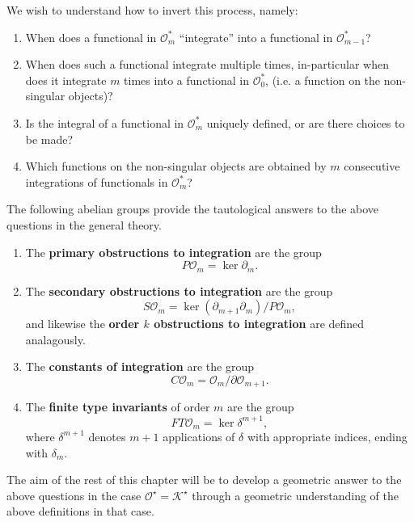 We wish to understand how to invert this process, namely:
\begin{questions}
	\begin{enumerate}
		\item When does a functional in \(\mathcal{O}^{\ast}_{m}\) ``integrate'' into a functional in \(\mathcal{O}^{\ast}_{m - 1}\)?
		\item When does such a functional integrate multiple times, in-particular when does it integrate \(m\) times into a functional in \(\mathcal{O}^{\ast}_{0}\), (i.e. a function on the non-singular objects)?
		\item Is the integral of a functional in \(\mathcal{O}_{m}^{\ast}\) uniquely defined, or are there choices to be made?
		\item Which functions on the non-singular objects are obtained by \(m\) consecutive integrations of functionals in \(\mathcal{O}_{m}^{\ast}\)?
	\end{enumerate}
\end{questions}
The following abelian groups provide the tautological answers to the above questions in the general theory.
\begin{definitions}
	\begin{enumerate}
		\item The \textbf{primary obstructions to integration} are the group
			\[P\mathcal{O}_{m} = \ker{\partial_{m}}.\]
		\item The \textbf{secondary obstructions to integration} are the group
			\[S\mathcal{O}_{m} = \ker{(\partial_{m + 1}\partial_{m})} / P\mathcal{O}_{m},\]
			and likewise the \textbf{order \(k\) obstructions to integration} are defined analagously.
		\item The \textbf{constants of integration} are the group
			\[C\mathcal{O}_{m} = \mathcal{O}_{m} / \partial \mathcal{O}_{m + 1}.\]
		\item The \textbf{finite type invariants} of order \(m\) are the group
			\[FT\mathcal{O}_{m} = \ker \delta^{m + 1},\]
			where \(\delta^{m + 1}\) denotes \(m + 1\) applications of \(\delta\) with appropriate indices, ending with \(\delta_{m}\).

	\end{enumerate}
\end{definitions}
The aim of the rest of this chapter will be to develop a geometric answer to the above questions in the case \(\mathcal{O}^{\star} = \mathcal{K}^{\star}\) through a geometric understanding of the above definitions in that case.


